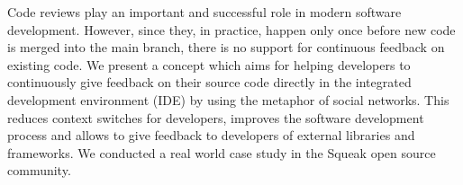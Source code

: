 
Code reviews play an important and successful role in modern software development. 
However, since they, in practice, happen only once before new code is merged into the main branch, there is no support for continuous feedback on existing code.
We present a concept which aims for helping developers to continuously give feedback on their source code directly in the integrated development environment (IDE) by using the metaphor of social networks. 
This reduces context switches for developers, improves the software development process and allows to give feedback to developers of external libraries and frameworks.
We conducted a real world case study in the Squeak open source community.
